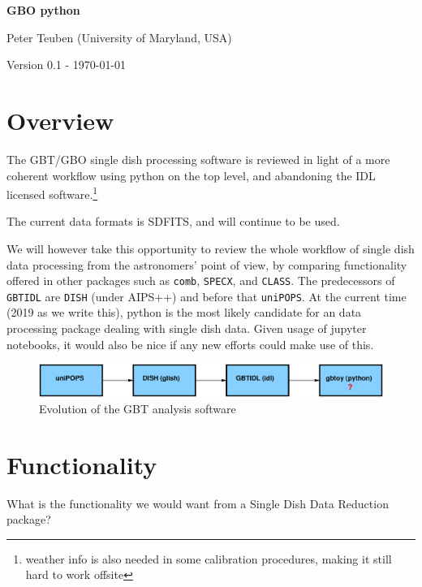 \documentclass[12pt,a4paper]{article}
\begin{document}
\pagestyle{plain}
 

\begin{center}
{\Large{\bf{  GBO python  \\  }}} 

\end{center}
\bigskip

\centerline{Peter Teuben (University of Maryland, USA)}

\centerline{Version 0.1 - \today}
\bigskip

\section{Overview}

The GBT/GBO single dish processing software is reviewed in light of
a more coherent workflow using python on the top level, and abandoning the
IDL licensed software.\footnote{weather info is also needed in some
  calibration procedures, making it still hard to work offsite}

The current data formats is SDFITS, and will continue to be used.

We will however take this opportunity to review the whole workflow of
single dish data processing from the astronomers' point of view, by
comparing functionality offered in other packages such as {\tt comb}, {\tt SPECX},
and {\tt CLASS}. The predecessors of {\tt GBTIDL} are {\tt DISH}
(under AIPS++) and before that {\tt uniPOPS}. At the current time
(2019 as we write this), python is the most likely candidate for an
data processing package dealing with single dish data. Given usage of
jupyter notebooks, it would also be nice if any new efforts could make
use of this.

\begin{figure}[h]
\centering
  \includegraphics[width=\textwidth]{fig1.eps}
\caption{\label{fig1} Evolution of the GBT analysis software}
\end{figure}

\section{Functionality}

What is the functionality we would want from a Single Dish Data Reduction
package? 
\end{document}
